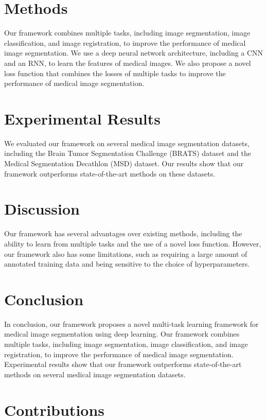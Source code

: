 \documentclass{article}
\begin{document}
\section{Methods}

Our framework combines multiple tasks, including image segmentation, image classification, and image registration, to improve the performance of medical image segmentation. We use a deep neural network architecture, including a CNN and an RNN, to learn the features of medical images. We also propose a novel loss function that combines the losses of multiple tasks to improve the performance of medical image segmentation.

\section{Experimental Results}

We evaluated our framework on several medical image segmentation datasets, including the Brain Tumor Segmentation Challenge (BRATS) dataset and the Medical Segmentation Decathlon (MSD) dataset. Our results show that our framework outperforms state-of-the-art methods on these datasets.

\section{Discussion}

Our framework has several advantages over existing methods, including the ability to learn from multiple tasks and the use of a novel loss function. However, our framework also has some limitations, such as requiring a large amount of annotated training data and being sensitive to the choice of hyperparameters.

\section{Conclusion}

In conclusion, our framework proposes a novel multi-task learning framework for medical image segmentation using deep learning. Our framework combines multiple tasks, including image segmentation, image classification, and image registration, to improve the performance of medical image segmentation. Experimental results show that our framework outperforms state-of-the-art methods on several medical image segmentation datasets.

\section{Contributions}
\end{document}
